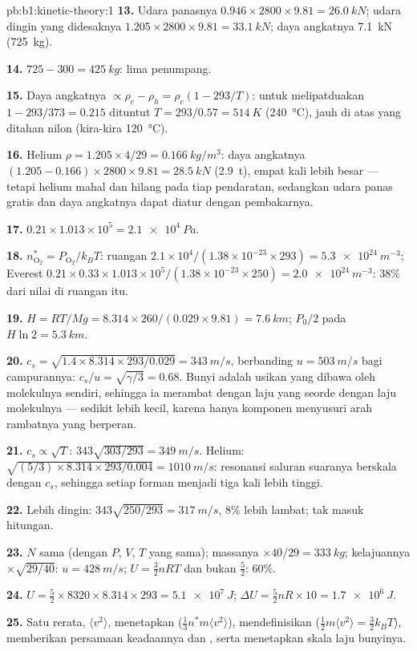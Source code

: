 \begin{solution}{pb:b1:kinetic-theory:1}
\textbf{13.} Udara panasnya $0.946 \times 2800 \times 9.81 = \qty{26.0}{kN}$; udara
dingin yang didesaknya $1.205 \times 2800 \times 9.81 = \qty{33.1}{kN}$; daya angkatnya \qty{7.1}{kN}
(\qty{725}{kg}).

\textbf{14.} $725 - 300 = \qty{425}{kg}$: lima penumpang.

\textbf{15.} Daya angkatnya $\propto \rho_c - \rho_h = \rho_c(1 - 293/T)$: untuk melipatduakan
$1 - 293/373 = 0.215$ dituntut $T = 293/0.57 = \qty{514}{K}$ (\qty{240}{\degreeCelsius}),
jauh di atas yang ditahan nilon (kira-kira \qty{120}{\degreeCelsius}).

\textbf{16.} Helium $\rho = 1.205 \times 4/29 = \qty{0.166}{kg/m^3}$: daya angkatnya
$(1.205 - 0.166) \times 2800 \times 9.81 = \qty{28.5}{kN}$ (\qty{2.9}{t}), empat
kali lebih besar --- tetapi helium mahal dan hilang pada tiap pendaratan, sedangkan
udara panas gratis dan daya angkatnya dapat diatur dengan pembakarnya.

\textbf{17.} $0.21 \times 1.013\times10^5 = \qty{2.1e4}{Pa}$.

\textbf{18.} $n^*_{\mathrm{O}_2} = P_{\mathrm{O}_2}/k_BT$: ruangan $2.1\times10^4/
(1.38\times10^{-23} \times 293) = \qty{5.3e24}{m^{-3}}$; Everest $0.21 \times 0.33
\times 1.013\times10^5/(1.38\times10^{-23} \times 250) = \qty{2.0e24}{m^{-3}}$:
$38\%$ dari nilai di ruangan itu.

\textbf{19.} $H = RT/Mg = 8.314 \times 260/(0.029 \times 9.81) = \qty{7.6}{km}$;
$P_0/2$ pada $H\ln 2 = \qty{5.3}{km}$.

\textbf{20.} $c_s = \sqrt{1.4 \times 8.314 \times 293/0.029} = \qty{343}{m/s}$,
berbanding $u = \qty{503}{m/s}$ bagi campurannya: $c_s/u = \sqrt{\gamma/3} = 0.68$.
Bunyi adalah usikan yang dibawa oleh molekulnya sendiri, sehingga ia
merambat dengan laju yang seorde dengan laju molekulnya --- sedikit lebih kecil, karena
hanya komponen menyusuri arah rambatnya yang berperan.

\textbf{21.} $c_s \propto \sqrt T$: $343\sqrt{303/293} = \qty{349}{m/s}$.
Helium: $\sqrt{(5/3) \times 8.314 \times 293/0.004} = \qty{1010}{m/s}$: resonansi
saluran suaranya berskala dengan $c_s$, sehingga setiap forman menjadi
tiga kali lebih tinggi.

\textbf{22.} Lebih dingin: $343\sqrt{250/293} = \qty{317}{m/s}$, $8\%$ lebih lambat;
 tak masuk hitungan.

\textbf{23.} $N$ sama (dengan $P$, $V$, $T$ yang sama); massanya $\times 40/29 = \qty{333}{kg}$;
kelajuannya $\times\sqrt{29/40}$: $u = \qty{428}{m/s}$; $U = \tfrac32 nRT$ dan bukan
$\tfrac52$: $60\%$.

\textbf{24.} $U = \tfrac52 \times 8320 \times 8.314 \times 293 = \qty{5.1e7}{J}$;
$\Delta U = \tfrac52 nR \times 10 = \qty{1.7e6}{J}$.

\textbf{25.} Satu rerata, $\langle v^2\rangle$, menetapkan 
($\tfrac13 n^*m\langle v^2\rangle$), mendefinisikan 
($\tfrac12 m\langle v^2\rangle = \tfrac32 k_BT$), memberikan persamaan keadaannya
dan , serta menetapkan skala laju bunyinya.
\end{solution}
